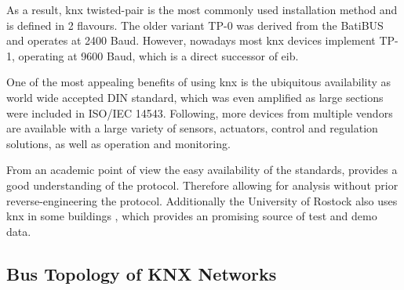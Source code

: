 As a result, \gls{knx} twisted-pair is the most commonly used installation method and is defined in 2 flavours. \parencite{DIN_EN_50090-5-2}
The older variant TP-0 was derived from the BatiBUS  and operates at 2400 Baud. However, nowadays most \gls{knx} devices implement TP-1, operating at 9600 Baud, which is a direct successor of \gls{eib}.

One of the most appealing benefits of using \gls{knx} is the ubiquitous availability as world wide accepted DIN standard, which was even amplified as large sections were included in ISO/IEC 14543.
Following, more devices from multiple vendors are available with a large variety of sensors, actuators, control and regulation solutions, as well as operation and monitoring.

From an academic point of view the easy availability of the standards, provides a good understanding of the protocol. Therefore allowing for analysis without prior reverse-engineering the protocol.
Additionally the University of Rostock also uses \gls{knx} in some buildings , which provides an promising source of test and demo data.
	
\subsection{Bus Topology of KNX Networks}
\label{sec:background:bas:knx:topo}

